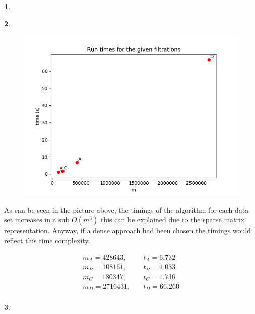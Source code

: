 \documentclass[10pt]{article} %
\theoremstyle{problemstyle}
\newtheorem{question}{\arabic{question}}
\begin{document}
\begin{question}
\label{q:6}

\end{question}

\newpage
\begin{question} %
\end{question}

\begin{figure}[H]
\centering
\includegraphics[scale=0.8]{plot_times.png}
\end{figure}
As can be seen in the picture above, the timings of the algorithm for each data set increases in a sub $O(m^3)$ this can be explained due to the sparse matrix representation. Anyway, if a dense approach had been chosen the timings would reflect this time complexity.

\begin{align*}
    m_A = 428643,\quad&t_A = 6.732\\
    m_B = 108161,\quad&t_B = 1.033\\
    m_C = 180347,\quad&t_C = 1.736\\
    m_D = 2716431,\quad&t_D = 66.260\\
\end{align*}

\begin{question} %
\end{question}
\end{document}
